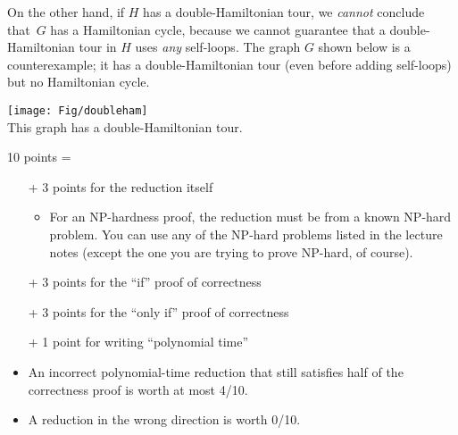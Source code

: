 \documentclass[11pt]{article}
\begin{document}
\begin{enumerate}
\begin{nonsolution}
On the other hand, if $H$ has a double-Hamiltonian tour, we \emph{cannot} conclude that~$G$ has a Hamiltonian cycle, because we cannot guarantee that a double-Hamiltonian tour in $H$ uses \emph{any} self-loops.  The graph $G$ shown below is a counterexample; it has a double-Hamiltonian tour (even before adding self-loops) but no Hamiltonian cycle. 

\begin{inline}
\texttt{[image: Fig/doubleham]}\\
This graph has a double-Hamiltonian tour.
\end{inline}

\end{nonsolution}

\begin{rubric}
10 points = 
\begin{itemize}\cramped
\item[+] 3 points for the reduction itself
\begin{itemize}\cramped
	\item For an {NP}-hardness proof, the reduction must be from a known {NP}-hard problem.  You can use any of the NP-hard problems listed in the lecture notes (except the one you are trying to prove NP-hard, of course).
\end{itemize}
\item[+] 3 points for the “if” proof of correctness
\item[+] 3 points for the “only if” proof of correctness
\item[+] 1 point for writing “polynomial time”
\medskip
\item An incorrect polynomial-time reduction that still satisfies half of the correctness proof is worth at most 4/10.
\item A reduction in the wrong direction is worth 0/10.
\end{itemize}
\end{rubric}

\end{enumerate}
\end{document}
